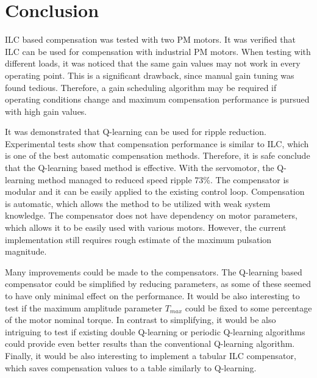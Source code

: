\section{Conclusion} 
ILC based compensation was tested with two PM motors. It was verified that ILC can be used for compensation with industrial PM motors. When testing with different loads, it was noticed that the same gain values may not work in every operating point. This is a significant drawback, since manual gain tuning was found tedious. Therefore, a gain scheduling algorithm may be required if operating conditions change and maximum compensation performance is pursued with high gain values.

It was demonstrated that Q-learning can be used for ripple reduction. Experimental tests show that compensation performance is similar to ILC, which is one of the best automatic compensation methods. Therefore, it is safe conclude that the Q-learning based method is effective. With the servomotor, the Q-learning method managed to reduced speed ripple 73\%. The compensator is modular and it can be easily applied to the existing control loop. Compensation is automatic, which allows the method to be utilized with weak system knowledge. The compensator does not have dependency on motor parameters, which allows it to be easily used with various motors. However, the current implementation still requires rough estimate of the maximum pulsation magnitude.

Many improvements could be made to the compensators. The Q-learning based compensator could be simplified by reducing parameters, as some of these seemed to have only minimal effect on the performance. It would be also interesting to test if the maximum amplitude parameter $T_{max}$ could be fixed to some percentage of the motor nominal torque. In contrast to simplifying, it would be also intriguing to test if existing double Q-learning or periodic Q-learning algorithms could provide even better results than the conventional Q-learning algorithm. Finally, it would be also interesting to implement a tabular ILC compensator, which saves compensation values to a table similarly to Q-learning. 

\clearpage
